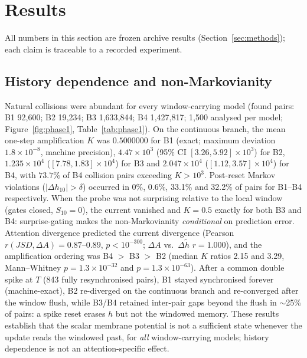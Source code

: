 \section{Results}\label{sec:results}

All numbers in this section are frozen archive results
(Section~\ref{sec:methods}); each claim is traceable to a recorded
experiment.

\subsection{History dependence and non-Markovianity}\label{sec:res-phase1}

Natural collisions were abundant for every window-carrying model
(found pairs: B1 92{,}600; B2 19{,}234; B3 1{,}633{,}844; B4
1{,}427{,}817; 1{,}500 analysed per model; Figure~\ref{fig:phase1},
Table~\ref{tab:phase1}).  On the continuous branch, the mean one-step
amplification $K$ was $0.5000000$ for B1 (exact; maximum deviation
$1.8\times10^{-8}$, machine precision), $4.47\times10^{3}$ (95\% CI
$[3.26,5.92]\times10^{3}$) for B2, $1.235\times10^{4}$
($[7.78,1.83]\times10^{4}$) for B3 and $2.047\times10^{4}$
($[1.12,3.57]\times10^{4}$) for B4, with $73.7\%$ of B4 collision pairs
exceeding $K > 10^{3}$.  Post-reset Markov violations
($|\Delta h_{10}| > \delta$) occurred in 0\%, 0.6\%, 33.1\% and 32.2\%
of pairs for B1--B4 respectively.  When the probe was not surprising
relative to the local window (gates closed, $S_{10} = 0$), the current
vanished and $K = 0.5$ exactly for both B3 and B4: surprise-gating makes
the non-Markovianity \emph{conditional} on prediction error.  Attention
divergence predicted the current divergence (Pearson
$r(JSD, \Delta A) = 0.87$--$0.89$, $p < 10^{-300}$; $\Delta A$ vs.\
$\Delta\tilde{h}$ $r = 1.000$), and the amplification ordering was
B4 $>$ B3 $>$ B2 (median $K$ ratios 2.15 and 3.29, Mann--Whitney
$p = 1.3\times10^{-32}$ and $p = 1.3\times10^{-63}$).  After a common
double spike at $T$ (843 fully resynchronised pairs), B1 stayed
synchronised forever (machine-exact), B2 re-diverged on the continuous
branch and re-converged after the window flush, while B3/B4 retained
inter-pair gaps beyond the flush in $\sim$25\% of pairs: a spike reset
erases $h$ but not the windowed memory.  These results establish that
the scalar membrane potential is not a sufficient state whenever the
update reads the windowed past, for \emph{all} window-carrying models;
history dependence is not an attention-specific effect.

